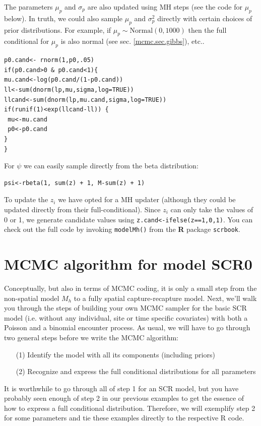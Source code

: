 The parameters $\mu_{p}$ and $\sigma_{p}$ are also updated using MH steps (see the code for $\mu_{p}$ below). In truth, we could also sample $\mu_{p}$
and $\sigma_{p}^{2}$ directly with certain choices of prior
distributions. For example, if $\mu_{p} \sim \mbox{Normal}(0, 1000)$
then the full conditional for $\mu_{p}$ is also normal (see
sec. \ref{mcmc.sec.gibbs}), etc..

\begin{verbatim}
p0.cand<- rnorm(1,p0,.05)
if(p0.cand>0 & p0.cand<1){
mu.cand<-log(p0.cand/(1-p0.cand))
ll<-sum(dnorm(lp,mu,sigma,log=TRUE))
llcand<-sum(dnorm(lp,mu.cand,sigma,log=TRUE))
if(runif(1)<exp(llcand-ll)) {
 mu<-mu.cand
 p0<-p0.cand
}
}
\end{verbatim}

For $\psi$ we can easily sample directly from the beta distribution:

\begin{verbatim}
psi<-rbeta(1, sum(z) + 1, M-sum(z) + 1)
\end{verbatim}

To update the $z_{i}$ we have opted for a MH updater
(although they could be updated directly from their
full-conditional). Since $z_{i}$ can only take the values of 0 or 1, we generate candidate values using \verb#z.cand<-ifelse(z==1,0,1)#.
You can check out the full code by invoking \mbox{\tt modelMh()} from the {\bf R} package \mbox{\tt scrbook}.

\section{MCMC algorithm for model SCR0}

Conceptually, but also in terms of MCMC coding, it is only a small
step from the non-spatial model $M_h$ to a fully spatial
capture-recapture model. Next, we'll walk you through the steps of
building your own MCMC sampler for the basic SCR model (i.e. without
any individual, site or time specific covariates) with both a Poisson
and a binomial encounter process.  As usual, we will have to go
through two general steps before we write the MCMC algorithm:
\begin{itemize}
\item[  (1)] Identify the model with all its components (including
    priors)
\item[  (2)] Recognize and express the full conditional distributions for
    all parameters
\end{itemize}
It is worthwhile to go through all of step 1 for an SCR model, but you
have probably seen enough of step 2 in our previous examples to get
the essence of how to express a full conditional
distribution. Therefore, we will exemplify step 2 for some parameters
and tie these examples directly to the respective R code.

